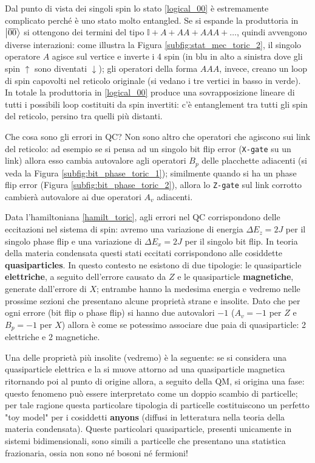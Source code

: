 \noindent Dal punto di vista dei singoli spin lo stato \eqref{logical_00} è estremamente complicato perché è uno stato molto entangled. Se si espande la produttoria in $\ket{\overline{00}}$ si ottengono dei termini del tipo $\mathbb{I} + A + AA + AAA + \ldots$, quindi avvengono diverse interazioni: come illustra la Figura \ref{subfig:stat_mec_toric_2}, il singolo operatore $A$ agisce sul vertice e inverte i 4 spin (in blu in alto a sinistra dove gli spin $\uparrow$ sono diventati $\downarrow$); gli operatori della forma $AAA$, invece, creano un loop di spin capovolti nel reticolo originale (si vedano i tre vertici in basso in verde). In totale la produttoria in \eqref{logical_00} produce una sovrapposizione lineare di tutti i possibili loop costituiti da spin invertiti: c'è entanglement tra tutti gli spin del reticolo, persino tra quelli più distanti. 

\noindent Che cosa sono gli errori in QC? Non sono altro che operatori che agiscono sui link del reticolo: ad esempio se si pensa ad un singolo bit flip error (\texttt{X-gate} su un link) allora esso cambia autovalore agli operatori $B_p$ delle placchette adiacenti (si veda la Figura \ref{subfig:bit_phase_toric_1}); similmente quando si ha un phase flip error (Figura \ref{subfig:bit_phase_toric_2}), allora lo \texttt{Z-gate} sul link corrotto cambierà autovalore ai due operatori $A_v$ adiacenti. 

\noindent Data l'hamiltoniana \eqref{hamilt_toric}, agli errori nel QC corrispondono delle eccitazioni nel sistema di spin: avremo una variazione di energia $\Delta E_z = 2 J$ per il singolo phase flip e una variazione di $\Delta E_x = 2 J$ per il singolo bit flip. In teoria della materia condensata questi stati eccitati corrispondono alle cosiddette \textbf{quasiparticles}. In questo contesto ne esistono di due tipologie: le quasiparticle \textbf{elettriche}, a seguito dell'errore causato da $Z$ e le quasiparticle \textbf{magnetiche}, generate dall'errore di $X$; entrambe hanno la medesima energia e  vedremo nelle prossime sezioni che presentano alcune proprietà strane e insolite. Dato che per ogni errore (bit flip o phase flip) si hanno due autovalori $-1$ ($A_v = -1$ per $Z$ e $B_p = -1$ per $X$) allora è come se potessimo associare due paia di quasiparticle: 2 elettriche e 2 magnetiche. 

\noindent Una delle proprietà più insolite (vedremo) è la seguente: se si considera una quasiparticle elettrica e la si muove attorno ad una quasiparticle magnetica ritornando poi al punto di origine allora, a seguito della QM, si origina una fase: questo fenomeno può essere interpretato come un doppio scambio di particelle; per tale ragione questa particolare tipologia di particelle costituiscono un perfetto "toy model" per i cosiddetti \textbf{anyons} (diffusi in letteratura nella teoria della materia condensata). Queste particolari quasiparticle, presenti unicamente in sistemi bidimensionali, sono simili a particelle che presentano una statistica frazionaria, ossia non sono né bosoni né fermioni!